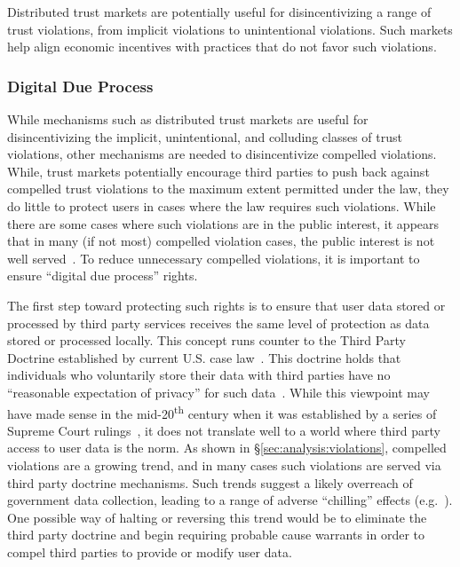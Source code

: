 Distributed trust markets are potentially useful for disincentivizing
a range of trust violations, from implicit violations to unintentional
violations. Such markets help align economic incentives with practices
that do not favor such violations.

\subsubsection{Digital Due Process}

While mechanisms such as distributed trust markets are useful for
disincentivizing the implicit, unintentional, and colluding classes of
trust violations, other mechanisms are needed to disincentivize
compelled violations. While, trust markets potentially encourage third
parties to push back against compelled trust violations to the maximum
extent permitted under the law, they do little to protect users in
cases where the law requires such violations. While there are some
cases where such violations are in the public interest, it appears
that in many (if not most) compelled violation cases, the public
interest is not well served~\cite{greenwald-collect,
  greenwald-prism}. To reduce unnecessary compelled violations, it is
important to ensure ``digital due process'' rights.

The first step toward protecting such rights is to ensure that user
data stored or processed by third party services receives the same
level of protection as data stored or processed locally. This concept
runs counter to the Third Party Doctrine established by current
U.S. case law~\cite{thompson-thirdparty}. This doctrine holds that
individuals who voluntarily store their data with third parties have
no ``reasonable expectation of privacy'' for such
data~\cite{scotus-katzvus}. While this viewpoint may have made sense
in the mid-20\textsuperscript{th} century when it was established by a
series of Supreme Court rulings~\cite{scotus-usvmiller-privacy,
  scotus-smithvmaryland}, it does not translate well to a world where
third party access to user data is the norm. As shown in
\S\ref{sec:analysis:violations}, compelled violations are a growing
trend, and in many cases such violations are served via third party
doctrine mechanisms. Such trends suggest a likely overreach of
government data collection, leading to a range of adverse ``chilling''
effects (e.g.~\cite{penney2016}). One possible way of halting or
reversing this trend would be to eliminate the third party doctrine
and begin requiring probable cause warrants in order to compel third
parties to provide or modify user data.

